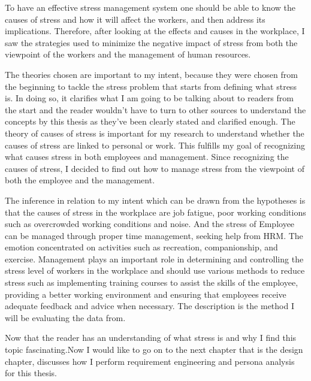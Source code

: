 To have an effective stress management system one should be able to know the causes of stress and how it will affect the workers, and then address its implications.  Therefore, after looking at the effects and causes in the workplace, I saw the strategies used to minimize the negative impact of stress from both the viewpoint of the workers and the management of human resources.

The theories chosen are important to my intent, because they were chosen from the beginning to tackle the stress problem that starts from defining what stress is. In doing so, it clarifies what I am going to be talking about to readers from the start and the reader wouldn't have to turn to other sources to understand the concepts by this thesis as they've been clearly stated and clarified enough.  The theory of causes of stress is important for my research to understand whether the causes of stress are linked to personal or work. This fulfills my goal of recognizing what causes stress in both employees and management. Since recognizing the causes of stress, I decided to find out how to manage stress from the viewpoint of both the employee and the management.

The inference in relation to my intent which can be drawn from the hypotheses is that the causes of stress in the workplace are job fatigue, poor working conditions such as overcrowded working conditions and noise.  And the stress of Employee can be managed through proper time management, seeking help from \acs{HRM}. The emotion concentrated on activities such as recreation, companionship, and exercise. Management plays an important role in determining and controlling the stress level of workers in the workplace and should use various methods to reduce stress such as implementing training courses to assist the skills of the employee, providing a better working environment and ensuring that employees receive adequate feedback and advice when necessary. The description is the method I will be evaluating the data from.

Now that the reader has an understanding of what stress is and why I find this topic fascinating.Now I would like to go on to the next chapter that is the design chapter, discusses how I perform requirement engineering and persona analysis for this thesis.